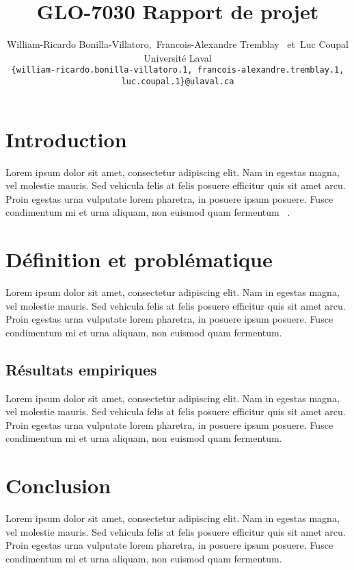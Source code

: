 \documentclass{article}
\title{GLO-7030 Rapport de projet}
\author{%
    \normalsize
    William-Ricardo Bonilla-Villatoro,\,
    Francois-Alexandre Tremblay
    \,
    \textnormal{et}\, Luc Coupal \\
    Université Laval \\
    {\scriptsize \texttt{\{william-ricardo.bonilla-villatoro.1, francois-alexandre.tremblay.1, luc.coupal.1\}@ulaval.ca}} \\
}
\begin{document}
    \maketitle

    \section{Introduction}
    Lorem ipsum dolor sit amet, consectetur adipiscing elit. Nam in egestas magna, vel molestie mauris. Sed vehicula felis at felis posuere efficitur quis sit amet arcu. Proin egestas urna vulputate lorem pharetra, in posuere ipsum posuere. Fusce condimentum mi et urna aliquam, non euismod quam fermentum ~\cite{Doyle1978}.

    \section{Définition et problématique}
    Lorem ipsum dolor sit amet, consectetur adipiscing elit. Nam in egestas magna, vel molestie mauris. Sed vehicula felis at felis posuere efficitur quis sit amet arcu. Proin egestas urna vulputate lorem pharetra, in posuere ipsum posuere. Fusce condimentum mi et urna aliquam, non euismod quam fermentum.

    \subsection{Résultats empiriques }
    Lorem ipsum dolor sit amet, consectetur adipiscing elit. Nam in egestas magna, vel molestie mauris. Sed vehicula felis at felis posuere efficitur quis sit amet arcu. Proin egestas urna vulputate lorem pharetra, in posuere ipsum posuere. Fusce condimentum mi et urna aliquam, non euismod quam fermentum.

    \section{Conclusion}
    Lorem ipsum dolor sit amet, consectetur adipiscing elit. Nam in egestas magna, vel molestie mauris. Sed vehicula felis at felis posuere efficitur quis sit amet arcu. Proin egestas urna vulputate lorem pharetra, in posuere ipsum posuere. Fusce condimentum mi et urna aliquam, non euismod quam fermentum.


    
\end{document}
